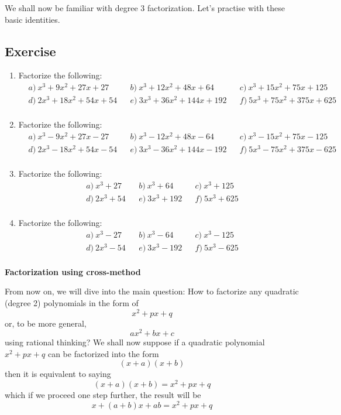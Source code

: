 \documentclass[12pt]{article}
\begin{document}
    We shall now be familiar with degree 3 factorization. Let's practise with these basic identities.

    \subsection*{Exercise}
    \begin{enumerate}
        \item Factorize the following:\begin{align*}
            &a)\ x^3+9x^2+27x+27&&b)\ x^3+12x^2+48x+64&&c)\ x^3+15x^2+75x+125\\
            &d)\ 2x^3+18x^2+54x+54&&e)\ 3x^3+36x^2+144x+192&&f)\ 5x^3+75x^2+375x+625\\
        \end{align*}
        \item Factorize the following:\begin{align*}
            &a)\ x^3-9x^2+27x-27&&b)\ x^3-12x^2+48x-64&&c)\ x^3-15x^2+75x-125\\
            &d)\ 2x^3-18x^2+54x-54&&e)\ 3x^3-36x^2+144x-192&&f)\ 5x^3-75x^2+375x-625\\
        \end{align*}
        \item Factorize the following:\begin{align*}
            &a)\ x^3+27&&b)\ x^3+64&&c)\ x^3+125\\
            &d)\ 2x^3+54&&e)\ 3x^3+192&&f)\ 5x^3+625\\
        \end{align*}
        \item Factorize the following:\begin{align*}
            &a)\ x^3-27&&b)\ x^3-64&&c)\ x^3-125\\
            &d)\ 2x^3-54&&e)\ 3x^3-192&&f)\ 5x^3-625\\
        \end{align*}
    \end{enumerate}

    \begin{center}
        \textbf{Factorization using cross-method}
    \end{center}

    From now on, we will dive into the main question: How to factorize any quadratic (degree 2) polynomials in the form of $$x^2+px+q$$ or, to be more general, $$ax^2+bx+c$$ using rational thinking? We shall now suppose if a quadratic polynomial $x^2+px+q$ can be factorized into the form $$(x+a)(x+b)$$ then it is equivalent to saying $$(x+a)(x+b)=x^2+px+q$$ which if we proceed one step further, the result will be $$x+(a+b)x+ab=x^2+px+q$$
\end{document}
